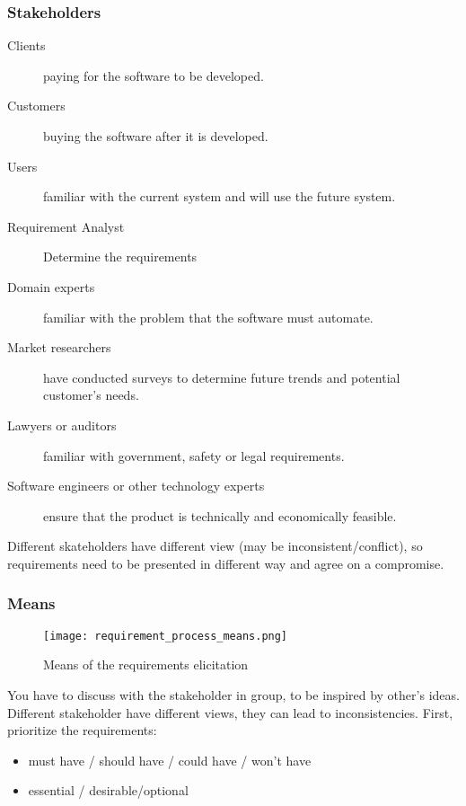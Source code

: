 \subsubsection{Stakeholders}

\begin{description}
    \item[Clients] paying for the software to be developed.
    \item[Customers] buying the software after it is developed.
    \item[Users] familiar with the current system and will use the future system.
    \item[Requirement Analyst] Determine the requirements
    \item[Domain experts] familiar with the problem that the software must automate.
    \item[Market researchers] have conducted surveys to determine future trends and potential customer’s needs.
    \item[Lawyers or auditors] familiar with government, safety or legal requirements.
    \item[Software engineers or other technology experts] ensure that the product is technically and economically feasible.
\end{description}

Different skateholders have different view (may be inconsistent/conflict), so requirements need to be
presented in different way and agree on a compromise.

\subsubsection{Means}

\begin{figure}[!ht]
    \centering
    \texttt{[image: requirement\_process\_means.png]}
    \caption{Means of the requirements elicitation}
\end{figure}

You have to discuss with the stakeholder in group, to be inspired by other’s ideas. Different
stakeholder have different views, they can lead to inconsistencies. First, prioritize the
requirements:
\begin{itemize}
	\item must have / should have / could have / won't have
	\item essential / desirable/optional
\end{itemize}

